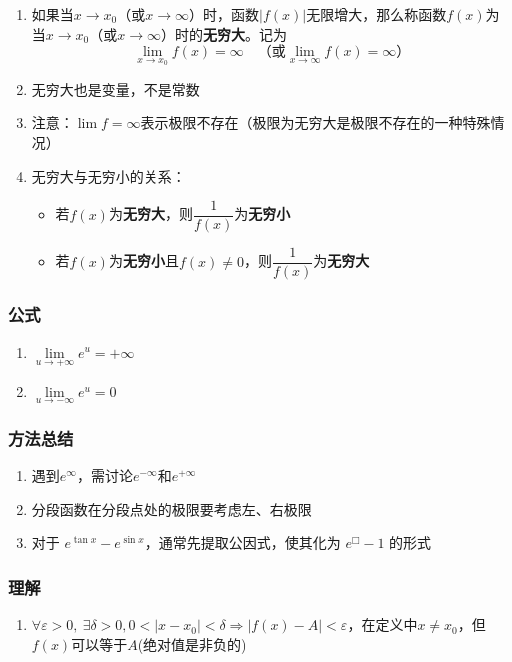 \documentclass[../book.tex]{subfiles}
\begin{document}
    \begin{enumerate}
        \item 如果当$x\to x_0$（或$x\to \infty$）时，函数$|f(x)|$无限增大，那么称函数$f(x)$为当$x\to x_0$（或$x\to \infty$）时的\textbf{无穷大}。记为
        \[
            \lim\limits_{x \to x_0} f(x) = \infty\quad \text{（或}\lim\limits_{x \to \infty} f(x) = \infty\text{）}
        \]
        \item 无穷大也是变量，不是常数
        \item 注意：$\lim f = \infty$表示极限不存在（极限为无穷大是极限不存在的一种特殊情况）
        \item 无穷大与无穷小的关系：
        \begin{itemize}
            \item 若$f(x)$为\textbf{无穷大}，则$\dfrac{1}{f(x)}$为\textbf{无穷小}
            \item 若$f(x)$为\textbf{无穷小}且$f(x) \neq 0$，则$\dfrac{1}{f(x)}$为\textbf{无穷大}
        \end{itemize}
    \end{enumerate}

    \subsubsection{公式}

    \begin{enumerate}
        \item $\lim\limits_{u\to+\infty}e^u = +\infty$
        \item $\lim\limits_{u\to-\infty}e^u = 0$
    \end{enumerate}

    \subsubsection{方法总结}

    \begin{enumerate}
        \item 遇到$e^{\infty}$，需讨论$e^{-\infty}$和$e^{+\infty}$
        \item 分段函数在分段点处的极限要考虑左、右极限
        \item 对于 $e^{\tan x} - e^{\sin x}$，通常先提取公因式，使其化为 $e^{\Box} - 1$ 的形式
    \end{enumerate}

    \subsubsection{理解}

    \begin{enumerate}
        \item $\forall\varepsilon>0,\ \exists\delta>0, 0<|x-x_0|<\delta \Rightarrow |f(x)-A|<\varepsilon$，在定义中$x \neq x_0$，但$f(x)$可以等于$A$(绝对值是非负的)
    \end{enumerate}
\end{document}
